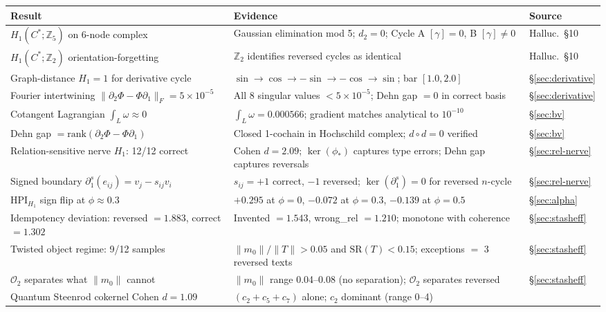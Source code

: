 \documentclass[11pt]{amsart}
\theoremstyle{definition}
\begin{document}
\begin{center}
\renewcommand{\arraystretch}{1.25}
\small
\begin{tabular}{@{}p{6.5cm}p{6cm}p{1.8cm}@{}}
\toprule
Result & Evidence & Source \\
\midrule
$H_1(C^*;\mathbb{Z}_5)$ on 6-node complex &
  Gaussian elimination mod 5; $d_2=0$; Cycle A $[\gamma]=0$, B $[\gamma]\neq0$ &
  Halluc.\ §10 \\
$H_1(C^*;\mathbb{Z}_2)$ orientation-forgetting &
  $\mathbb{Z}_2$ identifies reversed cycles as identical &
  Halluc.\ §10 \\
Graph-distance $H_1=1$ for derivative cycle &
  $\sin\to\cos\to{-\sin}\to{-\cos}\to\sin$; bar $[1.0,2.0]$ &
  §\ref{sec:derivative} \\
Fourier intertwining $\|\partial_2\Phi-\Phi\partial_1\|_F=5\times10^{-5}$ &
  All 8 singular values $<5\times10^{-5}$; Dehn gap $=0$ in correct basis &
  §\ref{sec:derivative} \\
Cotangent Lagrangian $\int_L\omega\approx 0$ &
  $\int_L\omega=0.000566$; gradient matches analytical to $10^{-10}$ &
  §\ref{sec:bv} \\
Dehn gap $=\mathrm{rank}(\partial_2\Phi-\Phi\partial_1)$ &
  Closed 1-cochain in Hochschild complex; $d\circ d=0$ verified &
  §\ref{sec:bv} \\
Relation-sensitive nerve $H_1$: 12/12 correct &
  Cohen $d=2.09$; $\ker(\phi_*)$ captures type errors; Dehn gap captures reversals &
  §\ref{sec:rel-nerve} \\
Signed boundary $\partial_1^s(e_{ij})=v_j - s_{ij}v_i$ &
  $s_{ij}=+1$ correct, $-1$ reversed; $\ker(\partial_1^s)=0$ for reversed $n$-cycle &
  §\ref{sec:rel-nerve} \\
$\mathrm{HPI}_{H_1}$ sign flip at $\phi\approx0.3$ &
  $+0.295$ at $\phi=0$, $-0.072$ at $\phi=0.3$, $-0.139$ at $\phi=0.5$ &
  §\ref{sec:alpha} \\
Idempotency deviation: reversed $=1.883$, correct $=1.302$ &
  Invented $=1.543$, wrong\_rel $=1.210$; monotone with coherence &
  §\ref{sec:stasheff} \\
Twisted object regime: 9/12 samples &
  $\|m_0\|/\|T\|>0.05$ and $\mathrm{SR}(T)<0.15$; exceptions $=$ 3 reversed texts &
  §\ref{sec:stasheff} \\
$\mathcal{O}_2$ separates what $\|m_0\|$ cannot &
  $\|m_0\|$ range 0.04--0.08 (no separation); $\mathcal{O}_2$ separates reversed &
  §\ref{sec:stasheff} \\
Quantum Steenrod cokernel Cohen $d=1.09$ &
  $(c_2+c_5+c_7)$ alone; $c_2$ dominant (range 0--4) &

\end{tabular}
\end{center}
\end{document}
